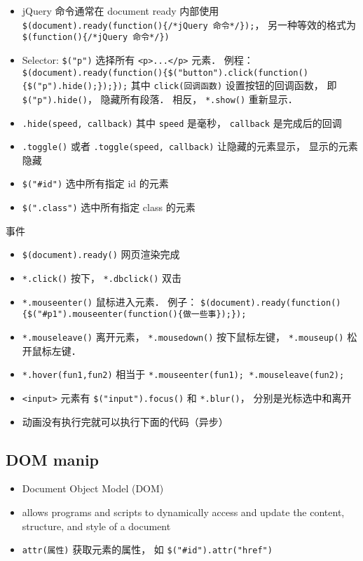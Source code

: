

\begin{itemize}
\item jQuery 命令通常在 document ready 内部使用 \verb|$(document).ready(function(){/*jQuery 命令*/});|， 另一种等效的格式为 \verb|$(function(){/*jQuery 命令*/})|
\item Selector: \verb|$("p")| 选择所有 \verb|<p>...</p>| 元素． 例程： \verb|$(document).ready(function(){$("button").click(function(){$("p").hide();});});| 其中 \verb|click(回调函数)| 设置按钮的回调函数， 即 \verb|$("p").hide()|， 隐藏所有段落． 相反， \verb|*.show()| 重新显示．
\item \verb|.hide(speed, callback)| 其中 \verb|speed| 是毫秒， \verb|callback| 是完成后的回调
\item \verb|.toggle()| 或者 \verb|.toggle(speed, callback)| 让隐藏的元素显示， 显示的元素隐藏
\item \verb|$("#id")| 选中所有指定 id 的元素
\item \verb|$(".class")| 选中所有指定 class 的元素
\end{itemize}

事件
\begin{itemize}
\item \verb|$(document).ready()| 网页渲染完成
\item \verb|*.click()| 按下， \verb|*.dbclick()| 双击
\item \verb|*.mouseenter()| 鼠标进入元素． 例子： \verb|$(document).ready(function(){$("#p1").mouseenter(function(){做一些事});});|
\item \verb|*.mouseleave()| 离开元素， \verb|*.mousedown()| 按下鼠标左键， \verb|*.mouseup()| 松开鼠标左键．
\item \verb|*.hover(fun1,fun2)| 相当于 \verb|*.mouseenter(fun1); *.mouseleave(fun2);|
\item \verb|<input>| 元素有 \verb|$("input").focus()| 和 \verb|*.blur()|， 分别是光标选中和离开
\item 动画没有执行完就可以执行下面的代码（异步）
\end{itemize}

\subsection{DOM manip}
\begin{itemize}
\item Document Object Model (DOM)
\item allows programs and scripts to dynamically access and update the content, structure, and style of a document
\item \verb|attr(属性)| 获取元素的属性， 如 \verb|$("#id").attr("href")|
\end{itemize}
